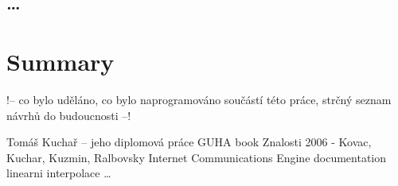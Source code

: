 \documentclass[a4paper,12pt]{book}
\begin{document}
\section{\dots}
\chapter{Summary}
!-- co bylo uděláno, co bylo naprogramováno součástí této práce, strčný seznam návrhů do budoucnosti --!



\begin{thebibliography}{thesisKuchar}
 Tomáš Kuchař -- jeho diplomová práce
 GUHA book
 Znalosti 2006 - Kovac, Kuchar, Kuzmin, Ralbovsky
 Internet Communications Engine documentation
 linearni interpolace 
 \dots
\end{thebibliography}
\end{document}
